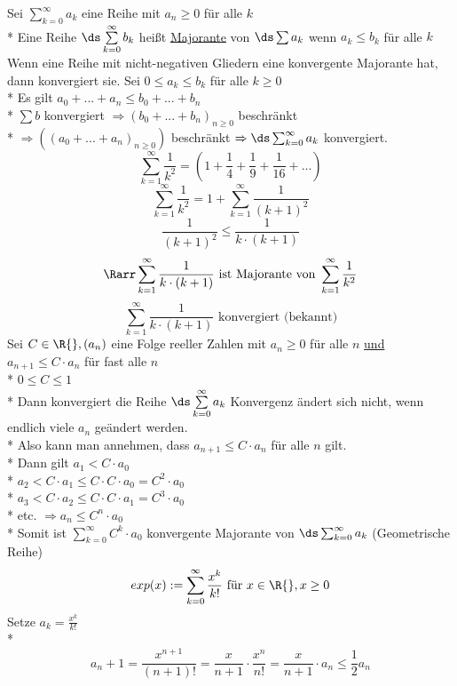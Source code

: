 \sSDef
Sei $\displaystyle\sum\limits_{k=0}^{\infty} a_k$ eine Reihe mit $a_n \geq 0$ für alle $k$\\*
Eine Reihe $\ds\sum\limits_{k=0}^{\infty} b_k$ heißt \ul{Majorante} von $\ds\sum a_k$ wenn $a_k \leq b_k$ für alle $k$
Wenn eine Reihe mit nicht-negativen Gliedern eine konvergente Majorante hat, dann konvergiert sie.
\bew
Sei $0 \leq a_k \leq b_k$ für alle $k \geq 0$\\*
Es gilt $a_0 + ... + a_n \leq b_0 + ... + b_n$ \\*
$\sum b$ konvergiert $\Rightarrow (b_0 + ... + b_n)_{n \geq 0}$  beschränkt\\*
$\Rightarrow ((a_0 + ... + a_n)_{n \geq 0})$ beschränkt $\Rightarrow \ds\sum_{k= 0}^{\infty} a_k$ konvergiert.
$$\sum\limits_{k=1}^{\infty} \frac{1}{k^2} = \left( 1 + \frac{1}{4} + \frac{1}{9}+ \frac{1}{16} + … \right)$$
$$\sum\limits_{k=1}^{\infty} \frac{1}{k^2} = 1 + \sum\limits_{k=1}^{\infty} \frac{1}{(k + 1)^2}$$
$$\frac{1}{(k + 1)^2} \leq \frac{1}{k \cdot (k + 1)}$$
$$\Rarr \sum\limits_{k=1}^{\infty} \frac{1}{k \cdot (k + 1)}\text{ ist Majorante von }\sum\limits_{k=1}^{\infty} \frac{1}{k^2}$$
$$\sum\limits_{k=1}^{\infty} \frac{1}{k \cdot (k + 1)}\text{ konvergiert (bekannt)}$$
Sei $C \in \R{}, (a_n)$ eine Folge reeller Zahlen mit $a_n \geq 0$ für alle $n$ \ul{und} $a_{n + 1} \leq C \cdot a_n$ für fast alle $n$\\*
$0 \leq C \leq 1$\\*
Dann konvergiert die Reihe $\ds\sum\limits_{k=0}^{\infty} a_k$
\bew
Konvergenz ändert sich nicht, wenn endlich viele $a_n$ geändert werden.\\*
Also kann man annehmen, dass $a_{n + 1} \leq C \cdot a_n$ für alle $n$ gilt.\\*
Dann gilt $a_1 < C \cdot a_0$\\*
$a_2 < C \cdot a_1 \leq C \cdot C \cdot a_0 = C^2 \cdot a_0$\\*
$a_3 < C \cdot a_2 \leq C \cdot C \cdot a_1 = C^3 \cdot a_0$\\*
etc. $\Rightarrow a_n \leq C^n \cdot a_0$\\*
Somit ist $\displaystyle\sum\limits_{k=0}^{\infty} C^k \cdot a_0$ konvergente Majorante von $\ds\sum_{k=0}^{\infty} a_k$ (Geometrische Reihe)
$$exp(x) := \sum\limits_{k=0}^{\infty} \frac{x^k}{k!} \text{ für } x \in \R{}, x \geq 0$$
Setze $a_k = \frac{x^k}{k!}$\\*
$$a_n+1 = \frac{x^{n + 1}}{(n + 1)!} = \frac{x}{n+1} \cdot \frac{x^n}{n!} = \frac{x}{n+1} \cdot a_n \leq \frac{1}{2} a_n$$
